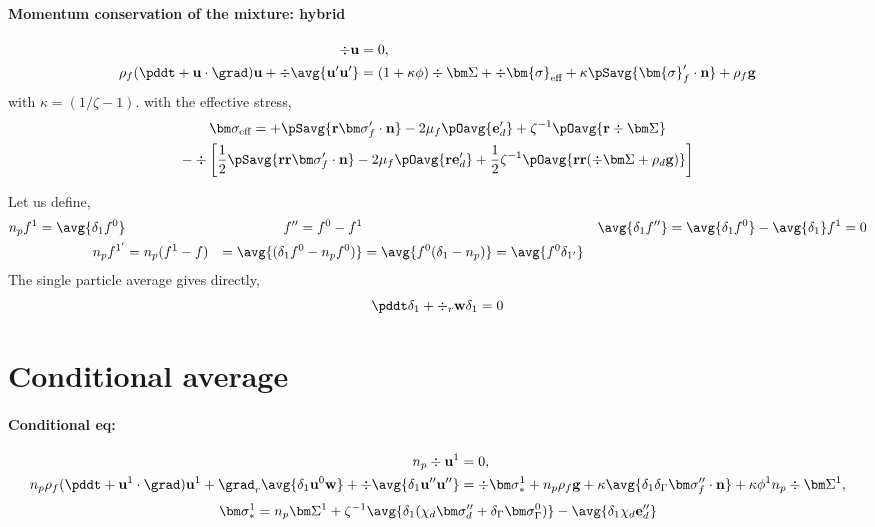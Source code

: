 \paragraph{Momentum conservation of the mixture: hybrid}
\begin{align}
    \label{eq:NS_not_dispersed_mass}
    \div\textbf{u}&=0, \\
    \rho_f (\pddt 
    + \textbf{u}\cdot \grad)
    \textbf{u}
    +\div\avg{\textbf{u}'\textbf{u}'}
    &= 
    (1+\kappa \phi)\div \bm\Sigma
    +\div \bm{\sigma}_\text{eff} 
    + \kappa \pSavg{ \bm{\sigma}_f' \cdot \textbf{n}} 
    + \rho_f \textbf{g} 
\end{align}
with $\kappa = (1/\zeta - 1)$. 
with the effective stress, 
\begin{multline}
    \bm\sigma_\text{eff}  = 
    + \pSavg{\textbf{r}\bm\sigma_f' \cdot \textbf{n}}
    -2\mu_f  \pOavg{ \textbf{e}_d'}
    + \zeta^{-1} \pOavg{\textbf{r}\div \bm\Sigma}
    \\
    - \div \left[
        \frac{1}{2}
        \pSavg{\textbf{rr}\bm\sigma_f' \cdot \textbf{n}}
        -2\mu_f \pOavg{\textbf{r}\textbf{e}_d'}
        + \frac{1}{2}\zeta^{-1}\pOavg{\textbf{rr}(\div\bm\Sigma + \rho_d \textbf{g})} 
    \right] 
\end{multline}


Let us define,
\begin{align}
    n_p f^1 =\avg{\delta_1 f^0}
    && 
    f'' = f^0 -  f^1  
    && 
    \avg{\delta_1 f''} =\avg{\delta_1 f^0} -  \avg{\delta_1} f^1 = 0  \\
    n_p f^{1'}
    &=
    n_p (f^1 - f)
    &=
    \avg{(\delta_1 f^0 - n_p  f^0)}
    &=
    \avg{f^0(\delta_1 - n_p )}
    =
    \avg{f^0\delta_{1'}}
\end{align}
The single particle average gives directly,
\begin{equation}
    \pddt \delta_1  +  \div_r \textbf{w} \delta_1 = 0
 \end{equation}

\section{Conditional average}
 \paragraph*{Conditional eq:}
 \begin{align*}
    n_p \div \textbf{u}^1 &= 0, \\
   n_p \rho_f(\pddt 
   + \textbf{u}^1 \cdot \grad) \textbf{u}^1
   + \grad_r \avg{\delta_1 \textbf{u}^0 \textbf{w}}
   + \div \avg{\delta_1 \textbf{u}'' \textbf{u}''}
   &= 
   \div \bm\sigma_*^1
   +n_p \rho_f \textbf{g}
   +\kappa\avg{\delta_1\delta_\Gamma  \bm\sigma_f''\cdot \textbf{n}}
   +\kappa \phi^1 n_p\div \bm\Sigma^1,
\end{align*}
\begin{equation}
    \bm\sigma_*^1 = 
    n_p \bm\Sigma^1
    + \zeta^{-1}\avg{\delta_1(\chi_d \bm\sigma_d'' + \delta_\Gamma \bm\sigma_\Gamma^0)}
    - \avg{\delta_1 \chi_d \textbf{e}_d''}
\end{equation}

